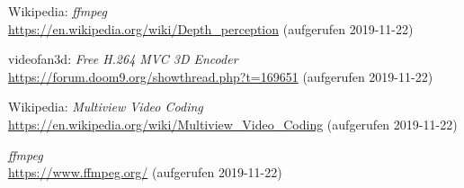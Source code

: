 \begin{thebibliography}{10}
Wikipedia:
\textit{ffmpeg}
\\\url{https://en.wikipedia.org/wiki/Depth_perception}
(aufgerufen 2019-11-22)

videofan3d:
\textit{Free H.264 MVC 3D Encoder}
\\\url{https://forum.doom9.org/showthread.php?t=169651}
(aufgerufen 2019-11-22)

Wikipedia:
\textit{Multiview Video Coding}
\\\url{https://en.wikipedia.org/wiki/Multiview_Video_Coding}
(aufgerufen 2019-11-22)

\textit{ffmpeg}
\\\url{https://www.ffmpeg.org/}
(aufgerufen 2019-11-22)

\end{thebibliography}
